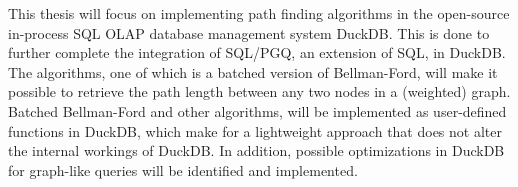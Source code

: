 This thesis will focus on implementing path finding algorithms in the open-source in-process SQL OLAP database management system DuckDB. This is done to further complete the integration of SQL/PGQ, an extension of SQL, in DuckDB. 
The algorithms, one of which is a batched version of Bellman-Ford, will make it possible to retrieve the path length between any two nodes in a (weighted) graph. 
Batched Bellman-Ford and other algorithms, will be implemented as user-defined functions in DuckDB, which make for a lightweight approach that does not alter the internal workings of DuckDB.
In addition, possible optimizations in DuckDB for graph-like queries will be identified and implemented.  